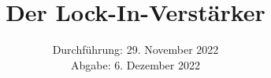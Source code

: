 

\subject{\texorpdfstring{\vspace{2ex}}{}303\texorpdfstring{\vspace{-2ex}}{}} %
\title{Der Lock-In\texorpdfstring{\hspace{0.1ex}}{}-\texorpdfstring{\hspace{-0.25ex}}{}Verstärker} %
\date{
	Durchführung: 29. November 2022 %
	\\ Abgabe: 6. Dezember 2022 %
}



\maketitle
{}

\thispagestyle{empty}
\tableofcontents
\newpage






\printbibliography{}


